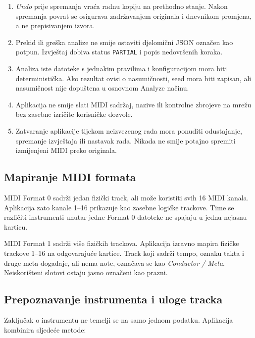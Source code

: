 \documentclass[11pt]{article}
\begin{document}
\begin{enumerate}[label=A\arabic*.]
    \item \emph{Undo} prije spremanja vraća radnu kopiju na prethodno stanje.
    Nakon spremanja povrat se osigurava zadržavanjem originala i dnevnikom
    promjena, a ne prepisivanjem izvora.

    \item Prekid ili greška analize ne smije ostaviti djelomični JSON označen
    kao potpun. Izvještaj dobiva status \texttt{PARTIAL} i popis nedovršenih
    koraka.

    \item Analiza iste datoteke s jednakim pravilima i konfiguracijom mora biti
    deterministička. Ako rezultat ovisi o nasumičnosti, seed mora biti zapisan,
    ali nasumičnost nije dopuštena u osnovnom Analyze načinu.

    \item Aplikacija ne smije slati MIDI sadržaj, nazive ili kontrolne zbrojeve
    na mrežu bez zasebne izričite korisničke dozvole.

    \item Zatvaranje aplikacije tijekom neizvezenog rada mora ponuditi
    odustajanje, spremanje izvještaja ili nastavak rada. Nikada ne smije potajno
    spremiti izmijenjeni MIDI preko originala.
\end{enumerate}

\subsection{Mapiranje MIDI formata}

MIDI Format 0 sadrži jedan fizički track, ali može koristiti svih 16 MIDI
kanala. Aplikacija zato kanale 1--16 prikazuje kao zasebne logičke trackove.
Time se različiti instrumenti unutar jedne Format 0 datoteke ne spajaju u jednu
nejasnu karticu.

MIDI Format 1 sadrži više fizičkih trackova. Aplikacija izravno mapira fizičke
trackove 1--16 na odgovarajuće kartice. Track koji sadrži tempo, oznaku takta i
druge meta-događaje, ali nema note, označava se kao \emph{Conductor / Meta}.
Neiskorišteni slotovi ostaju jasno označeni kao prazni.

\subsection{Prepoznavanje instrumenta i uloge tracka}

Zaključak o instrumentu ne temelji se na samo jednom podatku. Aplikacija
kombinira sljedeće metode:
\end{document}
